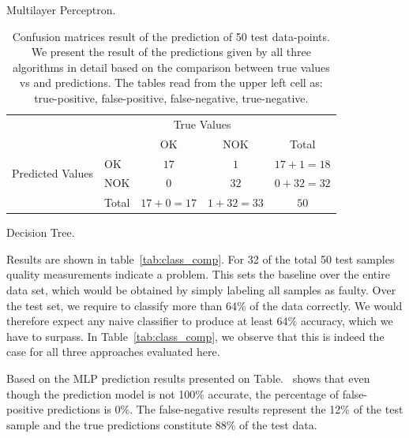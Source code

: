 \documentclass[5p,times,procedia]{elsarticle}
\begin{document}
\begin{table}
\begin{subtable}[h]{0.3\textwidth}
              \caption{Multilayer Perceptron.}
              \label{tab:MPL_conf_matrix}
       \end{subtable}
       \begin{subtable}[h]{0.3\textwidth}
              \centering
              \begin{adjustbox}{width=1.6\textwidth}
              \begin{tabular}{l|l|c|c|c}
                     \multicolumn{2}{c}{}&\multicolumn{2}{c}{True Values}&\\
                     \cline{3-4}
                     \multicolumn{2}{c|}{}& OK & NOK &\multicolumn{1}{c}{Total}\\
                     \cline{2-4}
                     \multirow{2}{*}{Predicted Values}& OK & $17$ & $1$ & $17+1 = 18$\\
                     \cline{2-4}
                     & NOK & $0$ & $32$ & $0+32 = 32$\\
                     \cline{2-4}
                     \multicolumn{1}{c}{} & \multicolumn{1}{c}{Total} & \multicolumn{1}{c}{$17+0 = 17$} & \multicolumn{    1}{c}{$1+32 = 33$} & \multicolumn{1}{c}{$50$}\\
              \end{tabular}
              \end{adjustbox}
              \caption{Decision Tree.}
              \label{tab:Tree_conf_matrix}
       \end{subtable}
       \caption{Confusion matrices result of the prediction of 50 test data-points. We present the result of the predictions given by all three algorithms in detail based on the comparison between true values vs and predictions. The tables read from the upper left cell as: true-positive, false-positive, false-negative, true-negative.}
       \label{tab:Confusion_matrix}
\end{table}


Results are shown in table~\ref{tab:class_comp}. For 32 of the total 50 test samples
quality measurements indicate a problem. This sets the 
baseline over the entire data set, which would be obtained by simply labeling all samples
as faulty. Over the test set, we require to classify more than 64\% of the data correctly.
We would therefore expect any naive classifier to produce at least 64\% accuracy, which we have to surpass. In Table~\ref{tab:class_comp}, we observe that this is indeed the case for all three approaches evaluated here.

Based on the MLP prediction results presented on Table.~ shows that even though the prediction model is not 100\% accurate, the percentage of false-positive predictions is 0\%. The false-negative results represent the 12\% of the test sample and the true predictions constitute 88\% of the test data.
\end{document}
